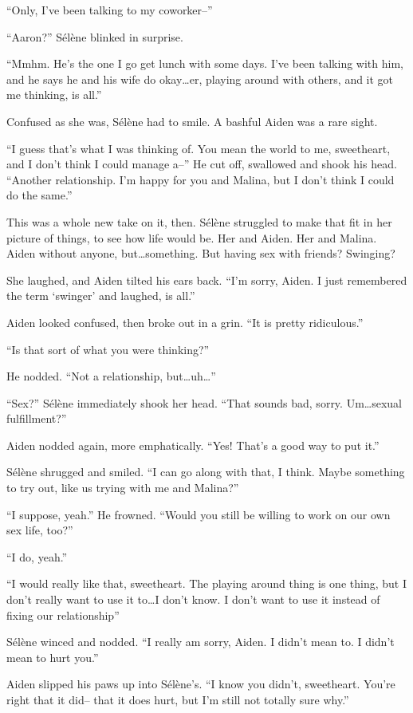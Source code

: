``Only, I've been talking to my coworker--''

``Aaron?'' Sélène blinked in surprise.

``Mmhm. He's the one I go get lunch with some days. I've been talking with him, and he says he and his wife do okay\ldots{}er, playing around with others, and it got me thinking, is all.''

Confused as she was, Sélène had to smile. A bashful Aiden was a rare sight.

``I guess that's what I was thinking of. You mean the world to me, sweetheart, and I don't think I could manage a--'' He cut off, swallowed and shook his head. ``Another relationship. I'm happy for you and Malina, but I don't think I could do the same.''

This was a whole new take on it, then. Sélène struggled to make that fit in her picture of things, to see how life would be. Her and Aiden. Her and Malina. Aiden without anyone, but\ldots{}something. But having sex with friends? Swinging?

She laughed, and Aiden tilted his ears back. ``I'm sorry, Aiden. I just remembered the term `swinger' and laughed, is all.''

Aiden looked confused, then broke out in a grin. ``It is pretty ridiculous.''

``Is that sort of what you were thinking?''

He nodded. ``Not a relationship, but\ldots{}uh\ldots{}''

``Sex?'' Sélène immediately shook her head. ``That sounds bad, sorry. Um\ldots{}sexual fulfillment?''

Aiden nodded again, more emphatically. ``Yes! That's a good way to put it.''

Sélène shrugged and smiled. ``I can go along with that, I think. Maybe something to try out, like us trying with me and Malina?''

``I suppose, yeah.'' He frowned. ``Would you still be willing to work on our own sex life, too?''

``I do, yeah.''

``I would really like that, sweetheart. The playing around thing is one thing, but I don't really want to use it to\ldots{}I don't know. I don't want to use it instead of fixing our relationship''

Sélène winced and nodded. ``I really am sorry, Aiden. I didn't mean to. I didn't mean to hurt you.''

Aiden slipped his paws up into Sélène's. ``I know you didn't, sweetheart. You're right that it did-- that it does hurt, but I'm still not totally sure why.''

